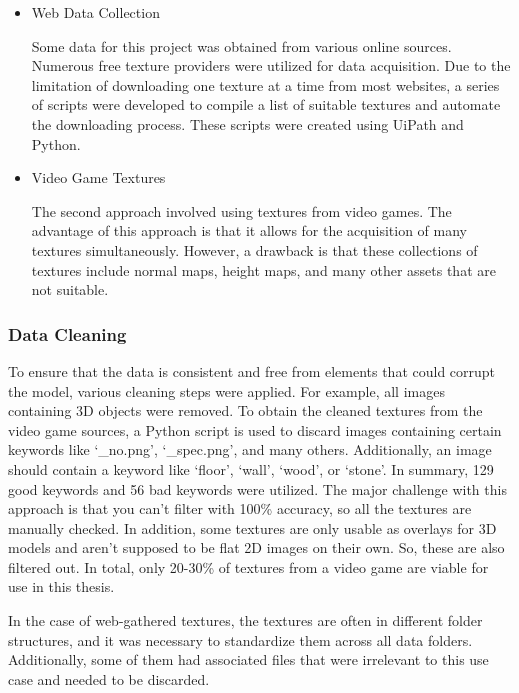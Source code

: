 \begin{itemize}
    \item Web Data Collection

    Some data for this project was obtained from various online sources. Numerous free texture providers were utilized for data acquisition. Due to the limitation of downloading one texture at a time from most websites, a series of scripts were developed to compile a list of suitable textures and automate the downloading process. These scripts were created using UiPath and Python.
    
    \item Video Game Textures

    The second approach involved using textures from video games. The advantage of this approach is that it allows for the acquisition of many textures simultaneously. However, a drawback is that these collections of textures include normal maps, height maps, and many other assets that are not suitable.


\end{itemize}

\subsubsection{Data Cleaning}

    To ensure that the data is consistent and free from elements that could corrupt the model, various cleaning steps were applied. For example, all images containing 3D objects were removed. To obtain the cleaned textures from the video game sources, a Python script is used to discard images containing certain keywords like `\_no.png', `\_spec.png', and many others. Additionally, an image should contain a keyword like `floor', `wall', `wood', or `stone'. In summary, 129 good keywords and 56 bad keywords were utilized. The major challenge with this approach is that you can't filter with 100\% accuracy, so all the textures are manually checked. In addition, some textures are only usable as overlays for 3D models and aren't supposed to be flat 2D images on their own. So, these are also filtered out. In total, only 20-30\% of textures from a video game are viable for use in this thesis.

    In the case of web-gathered textures, the textures are often in different folder structures, and it was necessary to standardize them across all data folders. Additionally, some of them had associated files that were irrelevant to this use case and needed to be discarded.

